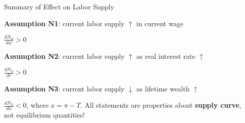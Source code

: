 \documentclass[11pt,aspectratio=169,usenames,dvipsnames]{beamer}
\let\tempone\itemize
\let\temptwo\enditemize
\renewenvironment{itemize}{\tempone\addtolength{\itemsep}{\fill}}{\temptwo}
\begin{document}
\begin{frame}{Summary of Effect on Labor Supply}
\label{slide:Summary_of_Effect_on_Labor_Supply}

\begin{itemize}
    \item \textbf{Assumption N1}: current labor supply $ \uparrow  $ in current wage
    \begin{itemize}
        \item $ \frac{d N_{S}}{d w} > 0 $
    \end{itemize}
    \item \textbf{Assumption N2}: current labor supply $ \uparrow  $ as real interest rate $ \uparrow  $
    \begin{itemize}
        \item $ \frac{d N_{S}}{d r} > 0 $
    \end{itemize}
    \item \textbf{Assumption N3}: current labor supply $ \downarrow  $ as lifetime wealth $ \uparrow  $
    \begin{itemize}
        \item $ \frac{d N_{S}}{d x} < 0 $, where $ x = \pi - T $.
    \end{itemize}
\end{itemize}
\alert{All statements are properties about \textbf{supply curve}, not equilibrium quantities!}
\end{frame}
\end{document}

